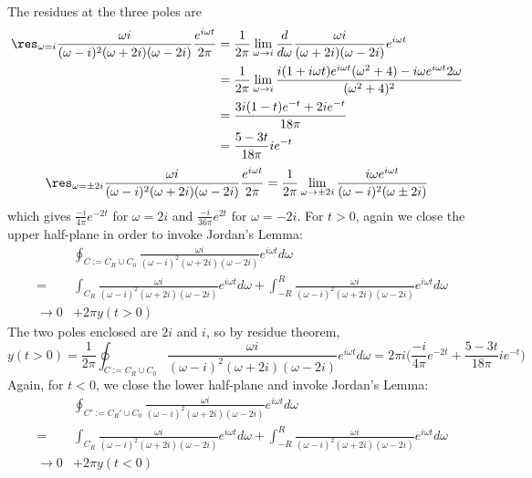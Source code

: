 \documentclass[a4paper]{article}
\begin{document}
\begin{ans}
\begin{enumerate}[label=(\alph*)]
\begin{center}
  \end{center}
The residues at the three poles are
\begin{align}
\res_{\omega=i}\frac{\omega i}{(\omega-i)^2(\omega+2i)(\omega-2i)}\frac{e^{i\omega t}}{2\pi}&=\frac{1}{2\pi}\lim_{\omega\rightarrow i}\frac{d}{d\omega}\frac{\omega i}{(\omega+2i)(\omega-2i)}e^{i\omega t}\nonumber\\&=\frac{1}{2\pi}\lim_{\omega\rightarrow i}\frac{i(1+i\omega t)e^{i\omega t}(\omega^2+4)-i\omega e^{i\omega t}2\omega}{(\omega^2+4)^2}\nonumber\\&=\frac{3i(1-t)e^{-t}+2ie^{-t}}{18\pi}\nonumber\\&=\frac{5-3t}{18\pi}ie^{-t}\nonumber
\end{align}
$$\res_{\omega=\pm 2i}\frac{\omega i}{(\omega-i)^2(\omega+2i)(\omega-2i)}\frac{e^{i\omega t}}{2\pi}=\frac{1}{2\pi}\lim_{\omega\rightarrow\pm 2i}\frac{i\omega e^{i\omega t}}{(\omega-i)^2(\omega\pm 2i)}$$
which gives $\frac{-i}{4\pi}e^{-2t}$ for $\omega=2i$ and $\frac{-i}{36\pi}e^{2t}$ for $\omega=-2i$. For $t>0$, again we close the upper half-plane in order to invoke Jordan's Lemma:
\begin{eqnarray}
&&\oint_{C:=C_R\cup C_0}\frac{\omega i}{(\omega-i)^2(\omega+2i)(\omega-2i)}e^{i\omega t}d\omega\nonumber\\&=&\int_{C_R}\frac{\omega i}{(\omega-i)^2(\omega+2i)(\omega-2i)}e^{i\omega t}d\omega+\int_{-R}^R\frac{\omega i}{(\omega-i)^2(\omega+2i)(\omega-2i)}e^{i\omega t}d\omega\nonumber\\&\rightarrow 0&+2\pi y(t>0)\nonumber
\end{eqnarray}
The two poles enclosed are $2i$ and $i$, so by residue theorem,
$$y(t>0)=\frac{1}{2\pi}\oint_{C:=C_R\cup C_0}\frac{\omega i}{(\omega-i)^2(\omega+2i)(\omega-2i)}e^{i\omega t}d\omega=2\pi i\bigg(\frac{-i}{4\pi}e^{-2t}+\frac{5-3t}{18\pi}ie^{-t}\bigg)$$
Again, for $t<0$, we close the lower half-plane and invoke Jordan's Lemma:
\begin{eqnarray}
&&\oint_{C':=C_R'\cup C_0}\frac{\omega i}{(\omega-i)^2(\omega+2i)(\omega-2i)}e^{i\omega t}d\omega\nonumber\\&=&\int_{C_R}\frac{\omega i}{(\omega-i)^2(\omega+2i)(\omega-2i)}e^{i\omega t}d\omega+\int_{-R}^R\frac{\omega i}{(\omega-i)^2(\omega+2i)(\omega-2i)}e^{i\omega t}d\omega\nonumber\\&\rightarrow 0&+2\pi y(t<0)\nonumber

\end{eqnarray}
\end{enumerate}
\end{ans}
\end{document}
